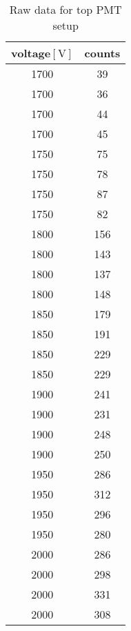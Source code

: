 \begin{table}[htpb]
	\centering
	\begin{tabular}{cc}
		\toprule
	voltage$[\si{\volt}]$ &  counts\\
	\midrule
\num{1700} & \num{ 39}\\
\num{1700} & \num{ 36}\\
\num{1700} & \num{ 44}\\
\num{1700} & \num{ 45}\\
\num{1750} & \num{ 75}\\
\num{1750} & \num{ 78}\\
\num{1750} & \num{ 87}\\
\num{1750} & \num{ 82}\\
\num{1800} & \num{ 156}\\
\num{1800} & \num{ 143}\\
\num{1800} & \num{ 137}\\
\num{1800} & \num{ 148}\\
\num{1850} & \num{ 179}\\
\num{1850} & \num{ 191}\\
\num{1850} & \num{ 229}\\
\num{1850} & \num{ 229}\\
\num{1900} & \num{ 241}\\
\num{1900} & \num{ 231}\\
\num{1900} & \num{ 248}\\
\num{1900} & \num{ 250}\\
\num{1950} & \num{ 286}\\
\num{1950} & \num{ 312}\\
\num{1950} & \num{ 296}\\
\num{1950} & \num{ 280}\\
\num{2000} & \num{ 286}\\
\num{2000} & \num{ 298}\\
\num{2000} & \num{ 331}\\
\num{2000} & \num{ 308}\\
\bottomrule
	\end{tabular}
	\caption{Raw data for top PMT setup}
	\label{tab:raw_top}
\end{table}

